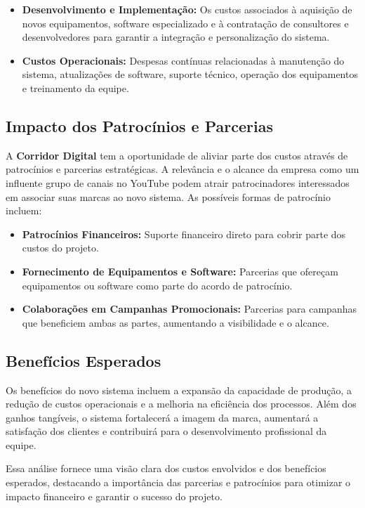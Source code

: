 \begin{itemize}
    \item \textbf{Desenvolvimento e Implementação:} Os custos associados à aquisição de novos equipamentos, software especializado e à contratação de consultores e desenvolvedores para garantir a integração e personalização do sistema.
    \item \textbf{Custos Operacionais:} Despesas contínuas relacionadas à manutenção do sistema, atualizações de software, suporte técnico, operação dos equipamentos e treinamento da equipe.
\end{itemize}

\subsection{Impacto dos Patrocínios e Parcerias}

A \textbf{Corridor Digital} tem a oportunidade de aliviar parte dos custos através de patrocínios e parcerias estratégicas. A relevância e o alcance da empresa como um influente grupo de canais no YouTube podem atrair patrocinadores interessados em associar suas marcas ao novo sistema. As possíveis formas de patrocínio incluem:

\begin{itemize}
    \item \textbf{Patrocínios Financeiros:} Suporte financeiro direto para cobrir parte dos custos do projeto.
    \item \textbf{Fornecimento de Equipamentos e Software:} Parcerias que ofereçam equipamentos ou software como parte do acordo de patrocínio.
    \item \textbf{Colaborações em Campanhas Promocionais:} Parcerias para campanhas que beneficiem ambas as partes, aumentando a visibilidade e o alcance.
\end{itemize}

\subsection{Benefícios Esperados}

Os benefícios do novo sistema incluem a expansão da capacidade de produção, a redução de custos operacionais e a melhoria na eficiência dos processos. Além dos ganhos tangíveis, o sistema fortalecerá a imagem da marca, aumentará a satisfação dos clientes e contribuirá para o desenvolvimento profissional da equipe.

Essa análise fornece uma visão clara dos custos envolvidos e dos benefícios esperados, destacando a importância das parcerias e patrocínios para otimizar o impacto financeiro e garantir o sucesso do projeto.

